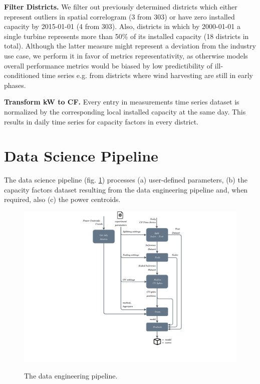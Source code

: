 \vspace{1em}
\noindent
\textbf{Filter Districts.}   We filter out previously determined districts  which either represent outliers in spatial correlogram (3 from 303) or have zero installed capacity by 2015-01-01 (4 from 303).
Also, districts in which by 2000-01-01 a single turbine represents more than 50\% of its installed capacity (18 districts in total).
Although the latter measure might represent a deviation from the industry use case, we perform it in favor of metrics representativity, as otherwise models overall performance metrics would be biased by low predictibility of ill-conditioned time series e.g. from districts where wind harvesting are still in early phases.

\vspace{1em}
\noindent
\textbf{Transform kW to CF.}  Every entry in measurements time series dataset is normalized by the corresponding local installed capacity at the same day.
This results in daily time series for capacity factors in every district.

\pagebreak

\section{Data Science Pipeline}
The data science pipeline (fig. \ref{fig:pipeline_ds}) processes (a) user-defined parameters, (b) the capacity factors dataset resulting from the data engineering pipeline and, when required, also (c) the power centroids.

\begin{figure}[H]
	\centering
    \caption{The data engineering pipeline.}
    \includegraphics[width=1.0\linewidth,trim={6cm 2cm 6cm 0cm},clip]{pipeline_ds.pdf}
	\label{fig:pipeline_ds}
\end{figure}

